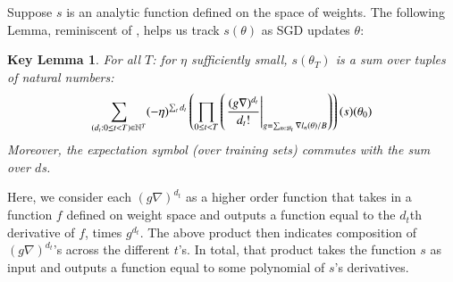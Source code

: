 \documentclass[final,12pt]{colt2021} %
\newtheorem*{klem*}{Key Lemma}
\newcommand{\wrap}[1]{\left(#1\right)}
\newcommand{\Bb}{\mathcal{B}}
\begin{document}
        Suppose $s$ is an analytic function defined on the space of weights.
        The following Lemma, reminiscent of \cite{dy49a}, helps us track
        $s(\theta)$ as SGD updates $\theta$:
        \begin{klem*} \label{lem:dyson}
            For all $T$: for $\eta$ sufficiently small, $s(\theta_T)$ is a sum
            over tuples of natural numbers:
            \begin{equation}\label{eq:dyson}
                \sum_{(d_t: 0\leq t<T) \in \NN^T}
                (-\eta)^{\sum_t d_t}
                \wrap{
                    \prod_{0 \leq t < T}
                        \wrap{\left.
                            \frac{(g \nabla)^{d_t}}{d_t!}
                        \right|_{g = \sum_{n\in \Bb_t} \nabla l_n(\theta) / B}}
                }(s) (\theta_0)
            \end{equation}
            Moreover, the expectation symbol (over training sets) commutes with
            the sum over $d$s.
        \end{klem*}
        Here, we consider each $(g \nabla)^{d_t}$ as a higher order function
        that takes in a function $f$ defined on weight space and outputs a
        function equal to the $d_t$th derivative of $f$, times $g^{d_t}$.
        The above product then indicates composition of $(g \nabla)^{d_t}$'s
        across the different $t$'s.  In total, that product takes the function
        $s$ as input and outputs a function equal to some polynomial of $s$'s
        derivatives.
\end{document}
